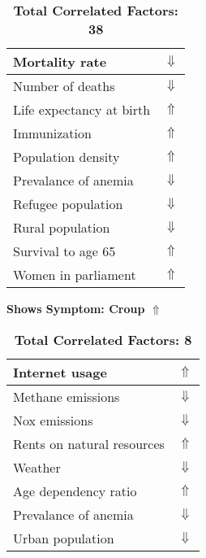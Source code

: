 \documentclass[12pt,notitlepage,oneside]{report}
\begin{document}
\begin{table}[!htb]
\begin{tabular}{|l|l|}
Mortality rate & $\Downarrow$\\ \hline
Number of deaths & $\Downarrow$\\ \hline
Life expectancy at birth & $\Uparrow$\\ \hline
Immunization & $\Uparrow$\\ \hline
Population density & $\Uparrow$\\ \hline
Prevalance of anemia & $\Downarrow$\\ \hline
Refugee population & $\Downarrow$\\ \hline
Rural population & $\Downarrow$\\ \hline
Survival to age 65 & $\Uparrow$\\ \hline
Women in parliament & $\Uparrow$\\ \hline
\end{tabular}
\caption*{\textbf{Total Correlated Factors: 38}}
\end{table}
\clearpage
\begin{table}[!htb]
\caption{\textbf{Shows Symptom: Croup $\Uparrow$}}
\centering
\label{Correlated Socio-economic Factors0}
\begin{tabular}{|l|l|}
\hline
Internet usage & $\Uparrow$\\ \hline
Methane emissions & $\Downarrow$\\ \hline
Nox emissions & $\Downarrow$\\ \hline
Rents on natural resources & $\Uparrow$\\ \hline
Weather & $\Downarrow$\\ \hline
Age dependency ratio & $\Uparrow$\\ \hline
Prevalance of anemia & $\Downarrow$\\ \hline
Urban population & $\Downarrow$\\ \hline
\end{tabular}
\caption*{\textbf{Total Correlated Factors: 8}}
\end{table}
\end{document}
